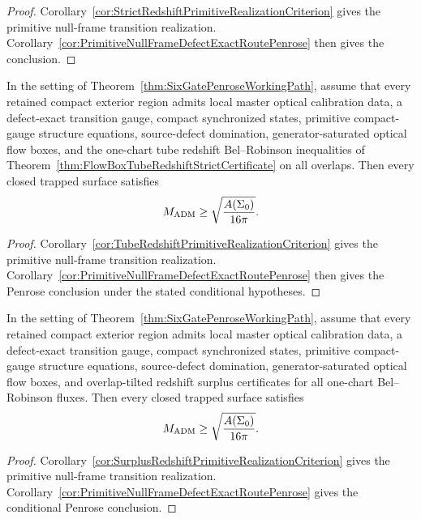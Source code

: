 \begin{proof}
Corollary~\ref{cor:StrictRedshiftPrimitiveRealizationCriterion} gives the primitive null-frame transition realization. Corollary~\ref{cor:PrimitiveNullFrameDefectExactRoutePenrose} then gives the conclusion.
\end{proof}

\begin{corollary}\label{cor:TubeRedshiftLocalRoutePenrose}
In the setting of Theorem~\ref{thm:SixGatePenroseWorkingPath}, assume that every retained compact exterior region admits local master optical calibration data, a defect-exact transition gauge, compact synchronized states, primitive compact-gauge structure equations, source-defect domination, generator-saturated optical flow boxes, and the one-chart tube redshift Bel--Robinson inequalities of Theorem~\ref{thm:FlowBoxTubeRedshiftStrictCertificate} on all overlaps. Then every closed trapped surface satisfies
\[
    M_{\mathrm{ADM}}\ge \sqrt{\frac{A(\Sigma_0)}{16\pi}} .
\]
\end{corollary}

\begin{proof}
Corollary~\ref{cor:TubeRedshiftPrimitiveRealizationCriterion} gives the primitive null-frame transition realization.  Corollary~\ref{cor:PrimitiveNullFrameDefectExactRoutePenrose} then gives the Penrose conclusion under the stated conditional hypotheses.
\end{proof}

\begin{corollary}\label{cor:SurplusRedshiftLocalRoutePenrose}
In the setting of Theorem~\ref{thm:SixGatePenroseWorkingPath}, assume that every retained compact exterior region admits local master optical calibration data, a defect-exact transition gauge, compact synchronized states, primitive compact-gauge structure equations, source-defect domination, generator-saturated optical flow boxes, and overlap-tilted redshift surplus certificates for all one-chart Bel--Robinson fluxes. Then every closed trapped surface satisfies
\[
    M_{\mathrm{ADM}}\ge \sqrt{\frac{A(\Sigma_0)}{16\pi}} .
\]
\end{corollary}

\begin{proof}
Corollary~\ref{cor:SurplusRedshiftPrimitiveRealizationCriterion} gives the primitive null-frame transition realization.  Corollary~\ref{cor:PrimitiveNullFrameDefectExactRoutePenrose} gives the conditional Penrose conclusion.
\end{proof}

